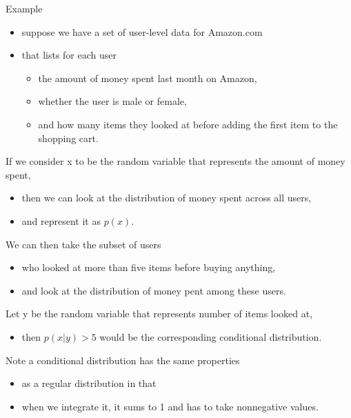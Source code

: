 \documentclass[]{article}
\providecommand{\tightlist}{%
  \setlength{\itemsep}{0pt}\setlength{\parskip}{0pt}}
\begin{document}
Example

\begin{itemize}
\tightlist
\item
  suppose we have a set of user-level data for Amazon.com
\item
  that lists for each user

  \begin{itemize}
  \tightlist
  \item
    the amount of money spent last month on Amazon,
  \item
    whether the user is male or female,
  \item
    and how many items they looked at before adding the first item to
    the shopping cart.
  \end{itemize}
\end{itemize}

If we consider x to be the random variable that represents the amount of
money spent,

\begin{itemize}
\tightlist
\item
  then we can look at the distribution of money spent across all users,
\item
  and represent it as \(p(x)\).
\end{itemize}

We can then take the subset of users

\begin{itemize}
\tightlist
\item
  who looked at more than five items before buying anything,
\item
  and look at the distribution of money pent among these users.
\end{itemize}

Let y be the random variable that represents number of items looked at,

\begin{itemize}
\tightlist
\item
  then \(p(x|y) > 5\) would be the corresponding conditional
  distribution.
\end{itemize}

Note a conditional distribution has the same properties

\begin{itemize}
\tightlist
\item
  as a regular distribution in that
\item
  when we integrate it, it sums to 1 and has to take nonnegative values.
\end{itemize}
\end{document}
